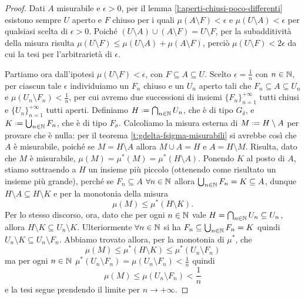 \begin{proof}
	Dati $A$ misurabile e $\epsilon>0$, per il lemma \ref{l:aperti-chiusi-poco-differenti} esistono sempre $U$ aperto e $F$ chiuso per i quali $\mu(A\setminus F)<\epsilon$ e $\mu(U\setminus A)<\epsilon$ per qualsiasi scelta di $\epsilon>0$.
	Poich\'e $(U\setminus A)\cup(A\setminus F)=U\setminus F$, per la subadditività della misura risulta $\mu(U\setminus F)\leq\mu(U\setminus A)+\mu(A\setminus F)$, perciò $\mu(U\setminus F)<2\epsilon$ da cui la tesi per l'arbitrarietà di $\epsilon$.

	Partiamo ora dall'ipotesi $\mu(U\setminus F)<\epsilon$, con $F\subseteq A\subseteq U$.
	Scelto $\epsilon=\frac1{n}$ con $n\in\mathbb{N}$, per ciascun tale $\epsilon$ individuiamo un $F_n$ chiuso e un $U_n$ aperto tali che $F_n\subseteq A\subseteq U_n$ e $\mu(U_n\setminus F_n)<\frac1{n}$, per cui avremo due successioni di insiemi $\{F_n\}_{n=1}^{+\infty}$ tutti chiusi e $\{U_n\}_{n=1}^{+\infty}$ tutti aperti.
	Definiamo $H\defeq\bigcap_{n\in\N}U_n$, che è di tipo $G_\delta$, e $K\defeq\bigcup_{n\in\N}F_n$, che è di tipo $F_\sigma$.
	Calcoliamo la misura esterna di $M\defeq H\setminus A$ per provare che è nulla: per il teorema \ref{t:gdelta-fsigma-misurabili} si avrebbe cos\`i che $A$ è misurabile, poich\'e se $M=H\setminus A$ allora $M\cup A=H$ e $A=H\setminus M$.
	Risulta, dato che $M$ è misurabile, $\mu(M)=\mu^*(M)=\mu^*(H\setminus A)$.
	Ponendo $K$ al posto di $A$, stiamo sottraendo a $H$ un insieme più piccolo (ottenendo come risultato un insieme più grande), perch\'e se $F_n\subseteq A$ $\forall n\in\mathbb{N}$ allora $\bigcup_{n\in\mathbb{N}}F_n=K\subseteq A$, dunque $H\setminus A\subseteq H\setminus K$ e per la monotonia della misura
	\begin{equation}
		\mu(M)\leq\mu^*(H\setminus K).
	\end{equation}
	Per lo stesso discorso, ora, dato che per ogni $n\in\mathbb{N}$ vale $H=\bigcap_{n\in\mathbb{N}}U_n\subseteq U_n$, allora $H\setminus K\subseteq U_n\setminus K$.
	Ulteriormente $\forall n\in\mathbb{N}$ si ha $F_n\subseteq\bigcup_{n\in\mathbb{N}}F_n=K$ quindi $U_n\setminus K\subseteq U_n\setminus F_n$.
	Abbiamo trovato allora, per la monotonia di $\mu^*$, che
	\begin{equation}
		\mu(M)\leq\mu^*(H\setminus K)\leq\mu^*(U_n\setminus F_n)
	\end{equation}
	ma per ogni $n\in\mathbb{N}$ $\mu^*(U_n\setminus F_n)=\mu(U_n\setminus F_n)<\frac1{n}$ quindi
	\begin{equation}
		\mu(M)\leq\mu(U_n\setminus F_n)<\frac1{n}
	\end{equation}
	e la tesi segue prendendo il limite per $n\to+\infty$.
\end{proof}

